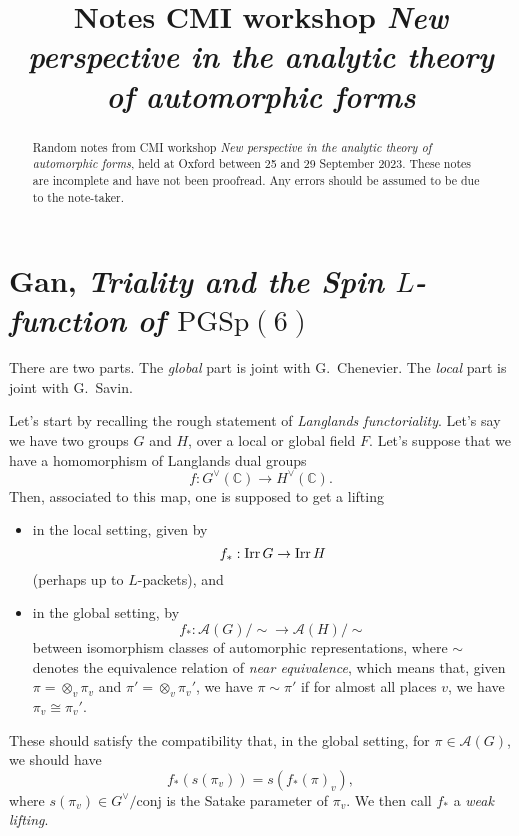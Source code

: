 \documentclass[reqno]{amsart} 
\title{Notes CMI workshop \emph{New perspective in the analytic theory of automorphic forms}}
\begin{document}
\maketitle

\begin{abstract}
  Random notes from CMI workshop \emph{New perspective in the analytic theory of automorphic forms}, held at Oxford between 25 and 29 September 2023.  These notes are incomplete and have not been proofread.  Any errors should be assumed to be due to the note-taker.
\end{abstract}


\section{Gan, \emph{Triality and the Spin $L$-function of $\mathrm{PGSp}(6)$}}

There are two parts.  The \emph{global} part is joint with G.\ Chenevier.  The \emph{local} part is joint with G.\ Savin.

Let's start by recalling the rough statement of \emph{Langlands functoriality}.  Let's say we have two groups $G$ and $H$, over a local or global field $F$.  Let's suppose that we have a homomorphism of Langlands dual groups
\begin{equation*}
  f : G^\vee  (\mathbb{C} ) \rightarrow H^\vee (\mathbb{C} ).
\end{equation*}
Then, associated to this map, one is supposed to get a lifting
\begin{itemize}
\item in the local setting, given by
  \begin{equation*}
    f _\ast : \operatorname{Irr} G \rightarrow \operatorname{Irr} H
  \end{equation*}
  (perhaps up to $L$-packets), and
\item in the global setting, by
  \begin{equation*}
    f _\ast : \mathcal{A} (G) / \sim \rightarrow \mathcal{A} (H) / \sim
  \end{equation*}
  between isomorphism classes of automorphic representations, where $\sim$ denotes the equivalence relation of \emph{near equivalence}, which means that, given $\pi = \otimes_v \pi_v $ and $\pi ' = \otimes_v \pi_v '$, we have $\pi \sim \pi '$ if for almost all places $v$, we have $\pi_v \cong \pi_v '$.
\end{itemize}
These should satisfy the compatibility that, in the global setting, for $\pi \in \mathcal{A}(G)$, we should have
\begin{equation*}
  f _\ast (s (\pi_v )) = s (f _\ast (\pi)_v ),
\end{equation*}
where $s (\pi_v ) \in G^\vee / \mathrm{conj}$ is the Satake parameter of $\pi_v$.  We then call $f _\ast $ a \emph{weak lifting}.
\end{document}
